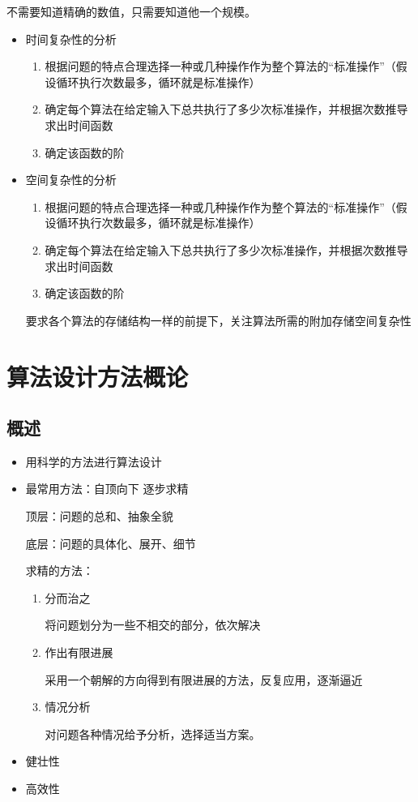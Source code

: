 \documentclass[AutoFakeBold]{LZUThesis2007}
\begin{document}
			不需要知道精确的数值，只需要知道他一个规模。

			\begin{itemize}
				\item 时间复杂性的分析
					\begin{enumerate}
						\item 根据问题的特点合理选择一种或几种操作作为整个算法的“标准操作”（假设循环执行次数最多，循环就是标准操作）
						\item 确定每个算法在给定输入下总共执行了多少次标准操作，并根据次数推导求出时间函数
						\item 确定该函数的阶
					\end{enumerate}
				\item 空间复杂性的分析
					\begin{enumerate}
						\item 根据问题的特点合理选择一种或几种操作作为整个算法的“标准操作”（假设循环执行次数最多，循环就是标准操作）
						\item 确定每个算法在给定输入下总共执行了多少次标准操作，并根据次数推导求出时间函数
						\item 确定该函数的阶
					\end{enumerate}
				
					要求各个算法的存储结构一样的前提下，关注算法所需的附加存储空间复杂性

			\end{itemize}

	\section{算法设计方法概论}
		\subsection{概述}
			\begin{itemize}
				\item 用科学的方法进行算法设计
				\item 最常用方法：自顶向下 逐步求精

						顶层：问题的总和、抽象全貌

						底层：问题的具体化、展开、细节

						求精的方法：

					\begin{enumerate}
						\item 分而治之

								将问题划分为一些不相交的部分，依次解决

						\item 作出有限进展

								采用一个朝解的方向得到有限进展的方法，反复应用，逐渐逼近

						\item 情况分析

								对问题各种情况给予分析，选择适当方案。

					\end{enumerate}

				\item 健壮性
				\item 高效性
			\end{itemize}
\end{document}
